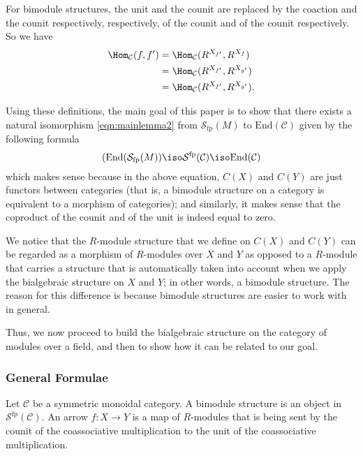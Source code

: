 \documentclass[a4paper,reqno,oneside]{article}
\begin{document}
For bimodule structures, the unit and the counit are replaced by the coaction and the counit respectively, respectively, of the counit and of the counit respectively. So we have
\begin{align*}
    \Hom_\mathcal{C}(f,f') &= \Hom_\mathcal{C}(R^{X_{f'}}, R^{X_{f}}) \\
    &= \Hom_\mathcal{C}(R^{X_{f'}}, R^{X_{g'}} ) \\
    &= \Hom_\mathcal{C}(R^{X_{f'}}, R^{X_{g'}} ).
\end{align*}


Using these definitions, the main goal of this paper is to show that there exists a natural isomorphism \eqref{eqn:mainlemma2} from $\mathcal{S}_{\mathrm{fp}}(M)$ to $\mathrm{End}(\mathcal{C})$ given by the following formula
\[
(\mathrm{End}(\mathcal{S}_{\mathrm{fp}}(M)) \iso\mathcal{S}^{\mathrm{fp}}(\mathcal{C})\iso \mathrm{End}(\mathcal{C})
\]
which makes sense because in the above equation, $C(X)$ and $C(Y)$ are just functors between categories (that is, a bimodule structure on a category is equivalent to a morphism of categories); and similarly, it makes sense that the coproduct of the counit and of the unit is indeed equal to zero. 


We notice that the $R$-module structure that we define on $C(X)$ and $C(Y)$ can be regarded as a morphism of $R$-modules over $X$ and $Y$ as opposed to a $R$-module that carries a structure that is automatically taken into account when we apply the bialgebraic structure on $X$ and $Y$; in other words, a bimodule structure. The reason for this difference is because bimodule structures are easier to work with in general. 

Thus, we now proceed to build the bialgebraic structure on the category of modules over a field, and then to show how it can be related to our goal.

\subsubsection*{General Formulae}

Let $\mathcal{C}$ be a symmetric monoidal category. A bimodule structure is an object in $\mathcal{S}^{\mathrm{fp}}(\mathcal{C})$. 
An arrow $f \colon X \to Y$ is a map of $R$-modules that is being sent by the counit of the coassociative multiplication to the unit of the coassociative multiplication. 
\end{document}
